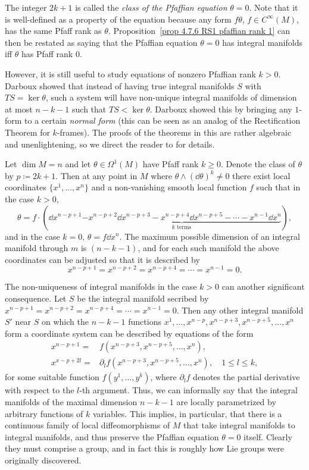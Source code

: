 The integer $2k+1$ is called the \emph{class of the Pfaffian equation} $\theta=0$. Note that it is well-defined as a property of the equation because any form $f\theta$, $f\in C^\infty(M)$, has the same Pfaff rank as $\theta$. Proposition~\ref{prop 4.7.6 RS1 pfaffian rank 1} can then be restated as saying that the Pfaffian equation $\theta=0$ has integral manifolds iff $\theta$ has Pfaff rank $0$.

However, it is still useful to study equations of nonzero Pfaffian rank $k>0$. Darboux showed that instead of having true integral manifolds $S$ with $TS=\ker\theta$, such a system will have non-unique integral manifolds of dimension at most $n-k-1$ such that $TS<\ker\theta$. Darboux showed this by bringing any $1$-form to a certain \emph{normal form} (this can be seen as an analog of the Rectification Theorem for $k$-frames). The proofs of the theorems in this \sect{} are rather algebraic and unenlightening, so we direct the reader to \cite{Bryant} for details.

\begin{thm}
    Let $\dim M=n$ and let $\theta\in\Omega^1(M)$ have Pfaff rank $k\geq 0$. Denote the class of $\theta$ by $p\coloneqq 2k+1$. Then at any point in $M$ where $\theta\wedge(\dd\theta)^k\neq 0$ there exist local coordinates $\{x^1,\ldots,x^n\}$ and a non-vanishing smooth local function $f$ such that in the case $k>0$,
    \[\theta=f\cdot (\dd x^{n-p+1}\underbrace{-x^{n-p+2}\dd x^{n-p+3}-x^{n-p+4}\dd x^{n-p+5}-\cdots -x^{n-1}\dd x^n}_{k\text{ terms}}),\]
    and in the case $k=0$, $\theta=f \dd x^n$. The maximum possible dimension of an integral manifold through $m$ is $(n-k-1)$, and for each such manifold the above coordinates can be adjusted so that it is described by 
    \[x^{n-p+1}=x^{n-p+2}=x^{n-p+4}=\cdots=x^{n-1}=0.\]
\end{thm}

The non-uniqueness of integral manifolds in the case $k>0$ can another significant consequence. Let $S$ be the integral manifold secribed by $x^{n-p+1}=x^{n-p+2}=x^{n-p+4}=\cdots=x^{n-1}=0$. Then any other integral manifold $S'$ near $S$ on which the $n-k-1$ functions $x^1,\ldots,x^{n-p},x^{n-p+3},x^{n-p+5},\ldots,x^n$ form a coordinate system can be described by equations of the form 
\begin{align}
    x^{n-p+1}=&f(x^{n-p+3},x^{n-p+5},\ldots,x^{n}),\\
    x^{x-p+2l}=&\partial_l f(x^{n-p+3},x^{n-p+5},\ldots,x^{n}),\quad 1\leq l\leq k,
\end{align}
for some suitable function $f(y^1,\ldots,y^k)$, where $\partial_l f$ denotes the partial derivative with respect to the $l$-th argument. Thus, we can informally say that the integral manifolds of the maximal dimension $n-k-1$ are locally parametrized by arbitrary functions of $k$ variables. This implies, in particular, that there is a continuous family of local diffeomorphisms of $M$ that take integral manifolds to integral manifolds, and thus preserve the Pfaffian equation $\theta=0$ itself. Clearly they must comprise a group, and in fact this is roughly how Lie groups were originally discovered.

